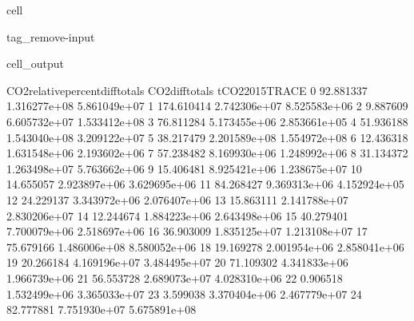 \documentclass[letterpaper,10pt,english]{jupyterBook}
\begin{document}
\begin{sphinxuseclass}{cell}
\begin{sphinxuseclass}{tag_remove-input}
\begin{sphinxVerbatimOutput}
\begin{sphinxuseclass}{cell_output}
\begin{sphinxVerbatim}[commandchars=\\\{\}]
    CO2\PYGZus{}relative\PYGZus{}percent\PYGZus{}diff\PYGZus{}totals  CO2\PYGZus{}diff\PYGZus{}totals  tCO2\PYGZus{}2015\PYGZus{}TRACE  \PYGZbs{}
0                         \PYGZhy{}92.881337    \PYGZhy{}1.316277e+08     5.861049e+07   
1                        \PYGZhy{}174.610414    \PYGZhy{}2.742306e+07     8.525583e+06   
2                          \PYGZhy{}9.887609    \PYGZhy{}6.605732e+07     1.533412e+08   
3                          76.811284     5.173455e+06     2.853661e+05   
4                          51.936188     1.543040e+08     3.209122e+07   
5                         \PYGZhy{}38.217479    \PYGZhy{}2.201589e+08     1.554972e+08   
6                          12.436318     1.631548e+06     2.193602e+06   
7                          57.238482     8.169930e+06     1.248992e+06   
8                          31.134372     1.263498e+07     5.763662e+06   
9                         \PYGZhy{}15.406481    \PYGZhy{}8.925421e+06     1.238675e+07   
10                         14.655057     2.923897e+06     3.629695e+06   
11                         84.268427     9.369313e+06     4.152924e+05   
12                         24.229137     3.343972e+06     2.076407e+06   
13                        \PYGZhy{}15.863111    \PYGZhy{}2.141788e+07     2.830206e+07   
14                         12.244674     1.884223e+06     2.643498e+06   
15                         40.279401     7.700079e+06     2.518697e+06   
16                        \PYGZhy{}36.903009    \PYGZhy{}1.835125e+07     1.213108e+07   
17                         75.679166     1.486006e+08     8.580052e+06   
18                        \PYGZhy{}19.169278    \PYGZhy{}2.001954e+06     2.858041e+06   
19                         20.266184     4.169196e+07     3.484495e+07   
20                        \PYGZhy{}71.109302    \PYGZhy{}4.341833e+06     1.966739e+06   
21                         56.553728     2.689073e+07     4.028310e+06   
22                         \PYGZhy{}0.906518    \PYGZhy{}1.532499e+06     3.365033e+07   
23                          3.599038    \PYGZhy{}3.370404e+06     2.467779e+07   
24                         82.777881    \PYGZhy{}7.751930e+07     5.675891e+08   


\end{sphinxVerbatim}
\end{sphinxuseclass}
\end{sphinxVerbatimOutput}
\end{sphinxuseclass}
\end{sphinxuseclass}
\end{document}
